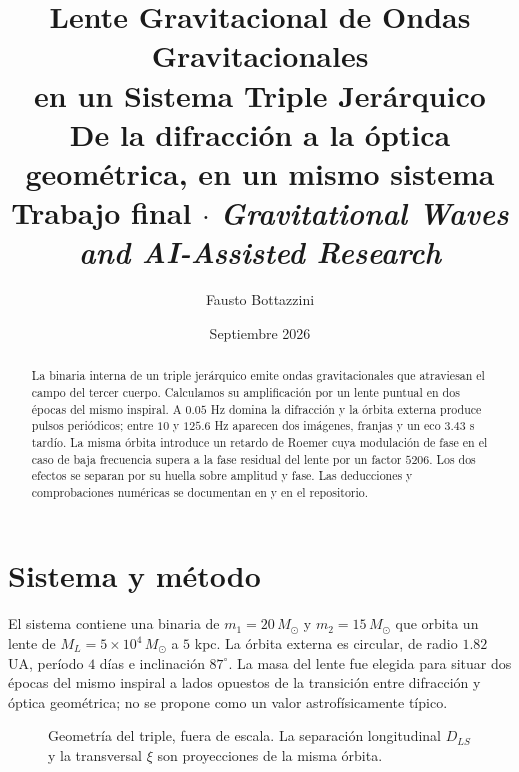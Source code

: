 \documentclass[11pt]{article}
\title{\Large Lente Gravitacional de Ondas Gravitacionales\\
en un Sistema Triple Jerárquico\\[4pt]
\large De la difracción a la óptica geométrica, en un mismo sistema\\[6pt]
\normalsize Trabajo final $\cdot$ \emph{Gravitational Waves and AI-Assisted Research}}
\author{Fausto Bottazzini}
\date{Septiembre 2026}
\newcommand{\Msun}{M_{\odot}}
\begin{document}
\maketitle
\begin{abstract}
La binaria interna de un triple jerárquico emite ondas gravitacionales que
atraviesan el campo del tercer cuerpo. Calculamos su amplificación por un
lente puntual en dos épocas del mismo inspiral. A $0.05$ Hz domina la
difracción y la órbita externa produce pulsos periódicos; entre $10$ y
$125.6$ Hz aparecen dos imágenes, franjas y un eco $3.43$ s tardío. La misma
órbita introduce un retardo de Roemer cuya modulación de fase en el caso de
baja frecuencia supera a la fase residual del lente por un factor $5206$.
Los dos efectos se separan por su huella sobre amplitud y fase. Las
deducciones y comprobaciones numéricas se documentan en \citep{Teoria} y
en el repositorio.
\end{abstract}

\section{Sistema y método}

El sistema contiene una binaria de $m_1=20\,\Msun$ y $m_2=15\,\Msun$ que
orbita un lente de $M_L=5\times10^4\,\Msun$ a $5$ kpc. La órbita externa
es circular, de radio $1.82$ UA, período $4$ días e inclinación
$87^\circ$. La masa del lente fue elegida para situar dos épocas del mismo
inspiral a lados opuestos de la transición entre difracción y óptica
geométrica; no se propone como un valor astrofísicamente típico.

\begin{figure}[H]
\centering
{}
\caption{Geometría del triple, fuera de escala. La separación longitudinal
$D_{LS}$ y la transversal $\xi$ son proyecciones de la misma órbita.}
\label{fig:geometria}
\end{figure}
\end{document}
